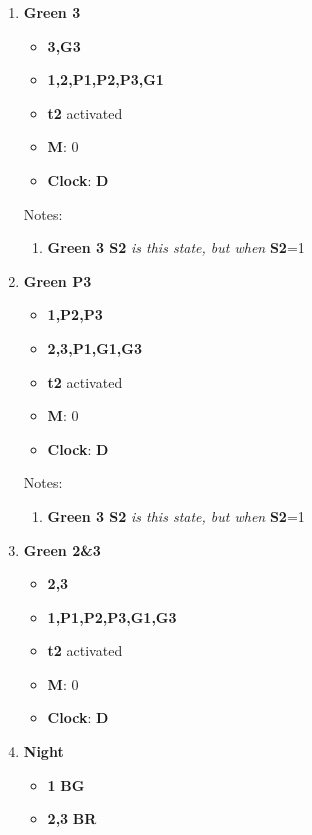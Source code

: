 \documentclass[letterpaper]{article}
\begin{document}
\begin{enumerate}
 \item \textbf{Green 3}
       \begin{itemize}
        \item {\color{green}\textbf{3,G3}}
        \item {\color{red}\textbf{1,2,P1,P2,P3,G1}}
        \item \textbf{t2} activated
        \item \textbf{M}: 0
        \item \textbf{Clock}: \textbf{D}
       \end{itemize}
       Notes:
       \begin{enumerate}
        \item \textbf{Green 3 S2} \textit{is this state, but when} \textbf{S2}=1
       \end{enumerate}
 \item \textbf{Green P3}
       \begin{itemize}
        \item {\color{green}\textbf{1,P2,P3}}
        \item {\color{red}\textbf{2,3,P1,G1,G3}}
        \item \textbf{t2} activated
        \item \textbf{M}: 0
        \item \textbf{Clock}: \textbf{D}
       \end{itemize}
       Notes:
       \begin{enumerate}
        \item \textbf{Green 3 S2} \textit{is this state, but when} \textbf{S2}=1
       \end{enumerate}
 \item \textbf{Green 2\&3}
       \begin{itemize}
        \item {\color{green}\textbf{2,3}}
        \item {\color{red}\textbf{1,P1,P2,P3,G1,G3}}
        \item \textbf{t2} activated
        \item \textbf{M}: 0
        \item \textbf{Clock}: \textbf{D}
       \end{itemize}
 \item \textbf{Night}
       \begin{itemize}
        \item {\color{green}\textbf{1}} \textbf{BG}
        \item {\color{red}\textbf{2,3}} \textbf{BR}

\end{itemize}
\end{enumerate}
\end{document}
